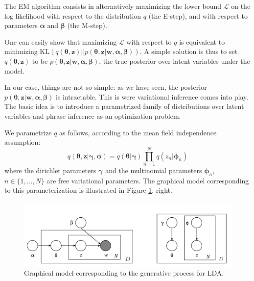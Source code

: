 \documentclass{article}
\begin{document}
The EM algorithm consists in alternatively maximizing the lower bound $\mathcal{L}$ on the log likelihood with respect to the distribution $q$ (the E-step), and with respect to parameters $\bm{\alpha}$ and $\bm{\beta}$ (the M-step).

One can easily show that maximizing $\mathcal{L}$ with respect to $q$ is equivalent to minimizing $\mathrm{KL}\left(q(\bm{\theta}, \mathbf{z}) || p(\bm{\theta}, \mathbf{z} | \mathbf{w}, \bm{\alpha}, \bm{\beta})\right)$. A simple solution is thus to set $q(\bm{\theta}, \mathbf{z})$ to be $p(\bm{\theta}, \mathbf{z} | \mathbf{w}, \bm{\alpha}, \bm{\beta})$, the true posterior over latent variables under the model.

In our case, things are not so simple: as we have seen, the posterior $p(\bm{\theta}, \mathbf{z} | \mathbf{w}, \bm{\alpha}, \bm{\beta})$ is intractable. This is were variational inference comes into play. The basic idea is to introduce a parametrized family of distributions over latent variables and phrase inference as an optimization problem. 

We parametrize $q$ as follows, according to the mean field independence assumption:
\begin{equation}
q(\bm{\theta}, \mathbf{z} | \bm{\gamma}, \bm{\phi}) =
q(\bm{\theta} | \bm{\gamma}) \prod_{n=1}^N q(z_n | \bm{\phi}_n)
\end{equation}
where the dirichlet parameters $\bm{\gamma}$ and the multinomial parameters $\bm{\phi}_n$, $n \in \{1,...,N\}$ are free variational parameters. The graphical model corresponding to this parameterization is illustrated in Figure \ref{graph_model2}, right.

\begin{figure}[ht]
\vskip 0.2in
\begin{center}
\centerline{\includegraphics[width=\columnwidth]{LDA_graph_model2}}
\caption{Graphical model corresponding to the generative process for LDA.}
\label{graph_model2}
\end{center}
\vskip -0.2in
\end{figure} 
\end{document}
